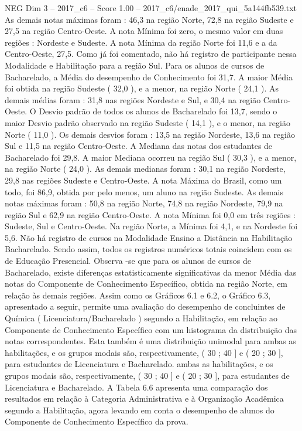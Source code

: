 \begin{textsample}{NEG Dim 3 – 2017\_c6 – Score 1.00 – 2017\_c6/enade\_2017\_qui\_5a144fb539.txt}
As demais notas máximas foram : 46,3 na região Norte, 72,8 na região Sudeste e 27,5 na região Centro-Oeste.
A nota Mínima foi zero, o mesmo valor em duas regiões : Nordeste e Sudeste.
A nota Mínima da região Norte foi 11,6 e a da Centro-Oeste, 27,5.
Como já foi comentado, não há registro de participante nessa Modalidade e Habilitação para a região Sul.
Para os alunos de cursos de Bacharelado, a Média do desempenho de Conhecimento foi 31,7.
A maior Média foi obtida na região Sudeste ( 32,0 ), e a menor, na região Norte ( 24,1 ).
As demais médias foram : 31,8 nas regiões Nordeste e Sul, e 30,4 na região Centro-Oeste.
O Desvio padrão de todos os alunos de Bacharelado foi 13,7, sendo o maior Desvio padrão observado na região Sudeste ( 14,1 ), e o menor, na região Norte ( 11,0 ).
Os demais desvios foram : 13,5 na região Nordeste, 13,6 na região Sul e 11,5 na região Centro-Oeste.
A Mediana das notas dos estudantes de Bacharelado foi 29,8.
A maior Mediana ocorreu na região Sul ( 30,3 ), e a menor, na região Norte ( 24,0 ).
As demais medianas foram : 30,1 na região Nordeste, 29,8 nas regiões Sudeste e Centro-Oeste.
A nota Máxima do Brasil, como um todo, foi 86,9, obtida por pelo menos, um aluno na região Sudeste.
As demais notas máximas foram : 50,8 na região Norte, 74,8 na região Nordeste, 79,9 na região Sul e 62,9 na região Centro-Oeste.
A nota Mínima foi 0,0 em três regiões : Sudeste, Sul e Centro-Oeste.
Na região Norte, a Mínima foi 4,1, e na Nordeste foi 5,6.
Não há registro de cursos na Modalidade Ensino a Distância na Habilitação Bacharelado.
Sendo assim, todos os registros numéricos totais coincidem com os de Educação Presencial.
Observa -se que para os alunos de cursos de Bacharelado, existe diferenças estatisticamente significativas da menor Média das notas do Componente de Conhecimento Específico, obtida na região Norte, em relação às demais regiões.
Assim como os Gráficos 6.1 e 6.2, o Gráfico 6.3, apresentado a seguir, permite uma avaliação do desempenho de concluintes de Química ( Licenciatura/Bacharelado ) segundo a Habilitação, em relação ao Componente de Conhecimento Específico com um histograma da distribuição das notas correspondentes.
Esta também é uma distribuição unimodal para ambas as habilitações, e os grupos modais são, respectivamente, ( 30 ; 40 ] e ( 20 ; 30 ], para estudantes de Licenciatura e Bacharelado. ambas as habilitações, e os grupos modais são, respectivamente, ( 30 ; 40 ] e ( 20 ; 30 ], para estudantes de Licenciatura e Bacharelado.
A Tabela 6.6 apresenta uma comparação dos resultados em relação à Categoria Administrativa e à Organização Acadêmica segundo a Habilitação, agora levando em conta o desempenho de alunos do Componente de Conhecimento Específico da prova.

\end{textsample}
